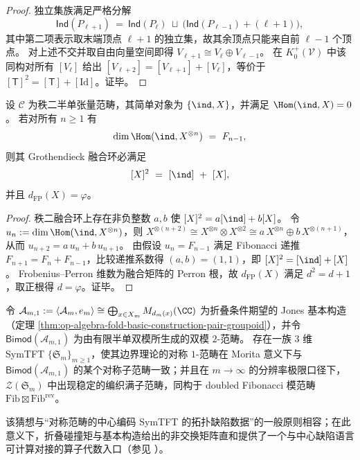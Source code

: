 \begin{proof}
独立集族满足严格分解
\[
\mathsf{Ind}(P_{\ell+1})\ =\ \mathsf{Ind}(P_\ell)\ \sqcup\ \bigl(\mathsf{Ind}(P_{\ell-1})+(\ell+1)\bigr),
\]
其中第二项表示取末端顶点 \(\ell+1\) 的独立集，故其余顶点只能来自前 \(\ell-1\) 个顶点。
对上述不交并取自由向量空间即得 \(V_{\ell+1}\cong V_\ell\oplus V_{\ell-1}\)。
在 \(K_0^+(\mathcal V)\) 中该同构对所有 \([V_\ell]\) 给出 \([V_{\ell+2}]=[V_{\ell+1}]+[V_\ell]\)，等价于 \([\mathsf T]^2=[\mathsf T]+[\mathrm{Id}]\)。证毕。
\end{proof}

\begin{proposition}\label{prop:pom-rank2-rigidity-fibonacci-fusion-law}
设 \(\mathcal C\) 为秩二半单张量范畴，其简单对象为 \(\{\ind,X\}\)，并满足 \(\Hom(\ind,X)=0\)。
若对所有 \(n\ge 1\) 有
\[
\dim\Hom(\ind, X^{\otimes n})\ =\ F_{n-1},
\]
则其 Grothendieck 融合环必满足
\[
[X]^2\ =\ [\ind]\ +\ [X],
\]
并且 \(d_{\mathrm{FP}}(X)=\varphi\)。
\end{proposition}

\begin{proof}
秩二融合环上存在非负整数 \(a,b\) 使 \( [X]^2=a[\ind]+b[X]\)。
令 \(u_n:=\dim\Hom(\ind,X^{\otimes n})\)，则
\(
X^{\otimes(n+2)}\cong X^{\otimes n}\otimes X^{\otimes 2}\cong a\,X^{\otimes n}\oplus b\,X^{\otimes(n+1)}
\)，
从而 \(u_{n+2}=a\,u_n+b\,u_{n+1}\)。
由假设 \(u_n=F_{n-1}\) 满足 Fibonacci 递推 \(F_{n+1}=F_n+F_{n-1}\)，比较递推系数得 \((a,b)=(1,1)\)，即 \([X]^2=[\ind]+[X]\)。
Frobenius--Perron 维数为融合矩阵的 Perron 根，故 \(d_{\mathrm{FP}}(X)\) 满足 \(d^2=d+1\)，取正根得 \(d=\varphi\)。证毕。
\end{proof}

\begin{conjecture}\label{conj:pom-fold-jones-tower-symtft-doubled-fib}
令 \(\mathcal A_{m,1}:=\langle \mathcal A_m,e_m\rangle\cong \bigoplus_{x\in X_m}M_{d_m(x)}(\CC)\) 为折叠条件期望的 Jones 基本构造（定理 \ref{thm:op-algebra-fold-basic-construction-pair-groupoid}），并令 \(\mathsf{Bimod}(\mathcal A_{m,1})\) 为由有限半单双模所生成的双模 \(2\)-范畴。
存在一族 \(3\) 维 SymTFT \(\{\mathfrak S_m\}_{m\ge 1}\)，使其边界理论的对称 \(1\)-范畴在 Morita 意义下与 \(\mathsf{Bimod}(\mathcal A_{m,1})\) 的某个对称子范畴一致；并且在 \(m\to\infty\) 的分辨率极限口径下，\(\mathcal Z(\mathfrak S_m)\) 中出现稳定的编织满子范畴，同构于 doubled Fibonacci 模范畴 \(\mathrm{Fib}\boxtimes \mathrm{Fib}^{\mathrm{rev}}\)。
\end{conjecture}

\begin{remark}
该猜想与“对称范畴的中心编码 SymTFT 的拓扑缺陷数据”的一般原则相容；在此意义下，折叠碰撞矩与基本构造给出的非交换矩阵直和提供了一个与中心缺陷语言可计算对接的算子代数入口（参见 \cite{BhardwajSchaferNameki2025GeneralizedChargesII}）。
\end{remark}

